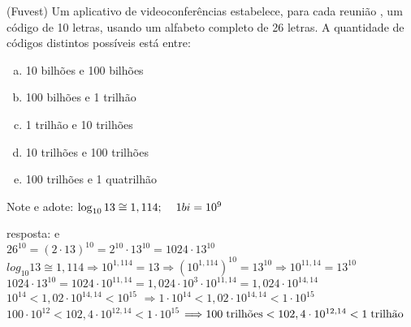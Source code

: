 \begin{ex}
  (Fuvest) Um aplicativo de videoconferências estabelece, para cada reunião , um código de 10 letras, usando um alfabeto completo de 26 letras. A quantidade de códigos distintos possíveis está entre:
  \begin{enumerate}  [(a)]
      \item 10 bilhões e 100 bilhões
      \item 100 bilhões e 1 trilhão
      \item 1 trilhão e 10 trilhões
      \item 10 trilhões e 100 trilhões
      \item 100 trilhões e 1 quatrilhão
  \end{enumerate}
  Note e adote: $\log_{10} 13 \cong 1,114; \hspace{0.4cm} 1bi = 10^9$
    \begin{sol}
     resposta: e\\
     $26^{10}=(2\cdot13)^{10}=2^{10}\cdot 13^{10}=1024\cdot13^{10}$ \\
     $log_{10}13 \cong1,114 \Rightarrow 10^{1,114}=13\Rightarrow (10^{1,114})^{10}=13^{10}\Longrightarrow 10^{11,14}=13^{10}$\\
     $1024\cdot13^{10}=1024\cdot10^{11,14}=1,024\cdot10^3\cdot10^{11,14}=1,024\cdot10^{14,14}$\\
     $10^{14} < 1,02\cdot10^{14,14} <10^{15}$\hspace{0,6cm} $\Longrightarrow 1\cdot10^{14}<1,02\cdot10^{14,14}<1\cdot10^{15}$\\
     $100\cdot10^{12}<102,4\cdot10^{12,14}<1\cdot10^{15}$\hspace{0,6cm} $\Longrightarrow 100 \hspace{0,1cm} \text{trilhões}< 102,4\cdot10^{12,14}< 1 \hspace{0,1cm} \text{trilhão}$
    \end{sol}
 \end{ex}